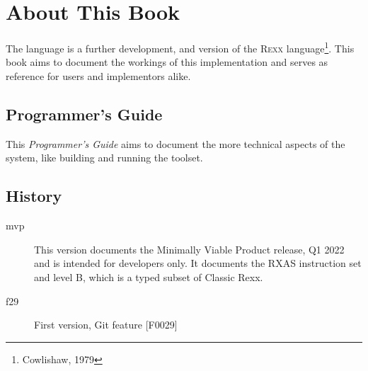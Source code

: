 \def\tightlist{}


\chapter*{About This Book}
The \crexx{} language is a further development, and version of the
\textsc{Rexx} language\footnote{Cowlishaw, 1979}. This book aims to
document the workings of this implementation and serves as reference
for users and implementors alike.

\section{Programmer's Guide}
This \emph{Programmer's Guide} aims to document the more technical aspects of the \crexx{} system, like building and running the toolset.

\section*{History}

\begin{description}
\item[mvp] This version documents the Minimally Viable Product
  release, Q1 2022 and is intended for developers only. It documents
  the RXAS instruction set and \crexx{} level B, which is a typed
  subset of Classic Rexx.
\item[f29] First version, Git feature [F0029]
\end{description}


